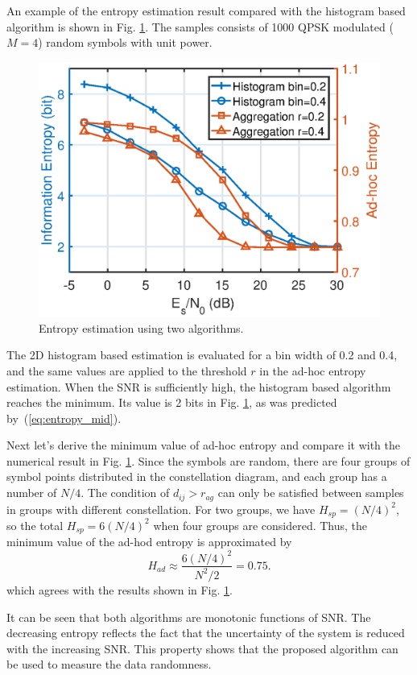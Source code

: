 \documentclass[journal,comsoc]{IEEEtran}
\begin{document}
An example of the entropy estimation result compared with the histogram based algorithm is shown in Fig. \ref{fig:adEnt}.
The samples consists of 1000 QPSK modulated (\(M=4\)) random symbols with unit power.

\begin{figure}[ht]
\centering
\includegraphics[width=3 in]{pic/adEnt.eps}
\caption{Entropy estimation using two algorithms.}
\label{fig:adEnt} 
\end{figure}

The 2D histogram based estimation is evaluated for a bin width of 0.2 and 0.4, and the same values are applied to the threshold \(r\) in the ad-hoc entropy estimation.
When the SNR is sufficiently high, the histogram based algorithm reaches the minimum. 
Its value is 2 bits in Fig. \ref{fig:adEnt}, as was predicted by~(\ref{eq:entropy_mid}).

Next let's derive the minimum value of ad-hoc entropy and compare it with the numerical result in Fig. \ref{fig:adEnt}.
Since the symbols are random, there are four groups of symbol points distributed in the constellation diagram, and each group has a number of \(N/4\).
The condition of $d_{ij}>r_{ag}$ can only be satisfied between samples in  groups with different constellation.
For two groups, we have $H_{sp} = (N/4)^2$, so the total $H_{sp} = 6 (N/4)^2$ when four groups are considered.
Thus, the minimum value of the ad-hod entropy is approximated by
\begin{equation}
H_{ad} \approx \frac{ 6 \left(N/4\right)^2}{N^2/2}=0.75.
\label{eq:adEntQPSK}
\end{equation}
which agrees with the results shown in Fig. \ref{fig:adEnt}.


It can be seen that both algorithms are monotonic functions of SNR.
The decreasing entropy reflects the fact that the uncertainty of the system is reduced with the increasing SNR.
This property shows that the proposed algorithm can be used to measure the data randomness.
\end{document}
